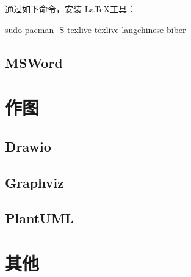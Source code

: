 通过如下命令，安装 \LaTeX 工具：

\begin{lstcode}
  sudo pacman -S texlive texlive-langchinese biber
\end{lstcode}

\subsection{MSWord}

\section{作图}
\subsection{Drawio}
\subsection{Graphviz}
\subsection{PlantUML}

\section{其他}
